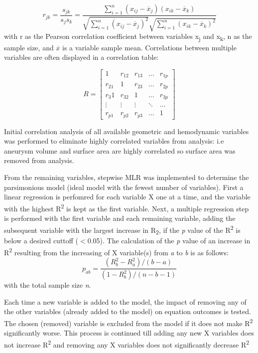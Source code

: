 \begin{equation}
r_{jk} = \frac{s_{jk}}{s_j s_k} = \frac{\sum_{i=1}^{n}(x_{ij} - \overline{x}_j)(x_{ik} - \overline{x}_k)}{\sqrt{\sum_{i=1}^{n}(x_{ij} - \overline{x}_j)^2}{\sqrt{\sum_{i=1}^{n}(x_{ik} - \overline{x}_k)^2}}}
\end{equation}
with r as the Pearson correlation coefficient between variables x\textsubscript{j} and x\textsubscript{k}, n as the sample size, and $\overline{x}$ is a variable sample mean. Correlations between multiple variables are often displayed in a correlation table:

\[
R = 
\begin{bmatrix}
    1       & r_{12} & r_{13} & \dots  & r_{1p} \\
    r_{21}       & 1 & r_{23} & \dots  & r_{2p} \\
    r_3{1}  & r_{32} & 1      & \dots  & r_{3p} \\
    \vdots  & \vdots & \vdots & \ddots & \dots  \\
    r_{p1}       & r_{p2}     & r_{p3} & \dots & 1
\end{bmatrix}
\]

Initial correlation analysis of all available geometric and hemodynamic variables was performed to eliminate highly correlated variables from analysis: i.e aneurysm volume and surface area are highly correlated so surface area was removed from analysis. 

From the remaining variables, stepwise MLR was implemented to determine the parsimonious model (ideal model with the fewest number of variables). First a linear regression is perfomred for each variable X one at a time, and the variable with the highest R\textsuperscript{2} is kept as the first variable. Next, a multiple regression step is performed with the first variable and each remaining variable, adding the subsequent variable with the largest increase in R\textsubscript{2}, if the \textit{p} value of the R\textsuperscript{2} is below a desired cuttoff ($<$0.05). The calculation of the \textit{p} value of an increase in R\textsuperscript{2} resulting from the increasing of X variable(s) from \textit{a} to \textit{b} is as follows:
\begin{equation}
p_{ab} = \frac{(R^2 _b - R^2 _a)/(b-a)}{(1-R^2 _b) / (n-b-1)}
\end{equation}
with the total sample size \textit{n}.

Each time a new variable is added to the model, the impact of removing any of the other variables (already added to the model) on equation outcomes is tested. The chosen (removed) variable is excluded from the model if it does not make R\textsuperscript{2} significantly worse. This process is continued till adding any new X variables does not increase R\textsuperscript{2} and removing any X variables does not significantly decrease R\textsuperscript{2}




